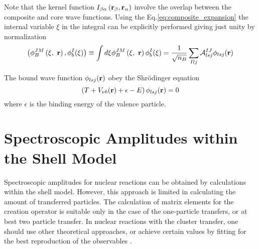 \documentclass[
12pt, %
oneside, %
english, %
onehalfspacing, %
onehalfspacing, %
headsepline, %
]{MastersDoctoralThesis} %
\begin{document}
Note that the kernel function $I_{\beta \alpha}   \left( {\bf r}_\beta ,  {\bf r}_\alpha \right)  $ involve the overlap between the composite and core wave functions. 
Using the Eq.\ref{eq:composite_expansion} the internal variable $\xi$ in the integral can be explicitly performed giving just unity by normalization
\begin{equation}
\left( \phi^{JM}_B \left( \xi,~{\bf r} \right), \phi_b^I ( \xi ) \right)
\equiv 
\int d \xi \phi^{JM}_B \left( \xi,~{\bf r} \right)  \phi_b^I ( \xi ) = 
\frac{1}{\sqrt{n_B}}
 \sum_{Ilj} \mathcal{A}_{lsj}^{IJ}  \phi_{lsj} ({\bf r})
\end{equation}
 
 The bound wave function $ \phi_{lsj} ({\bf r})$ obey the Shr\"{o}dinger equation 
 \begin{equation}
 \left( T + V_{\nu b} ({\bf r}) + \epsilon - E \right) \phi_{lsj} ({\bf r}) = 0
 \end{equation}
 where $\epsilon$ is the binding energy of the valence particle.
 
 
 
\section{Spectroscopic Amplitudes within the Shell Model}
Spectroscopic amplitudes for nuclear reactions can be obtained by calculations within the shell model. However, this approach is limited in calculating the amount of transferred particles. The calculation of matrix elements for the creation operator is suitable only in the case of the one-particle transfers, or at best two particle transfer. In nuclear reactions with the cluster transfer, one should use other theoretical approaches, or achieve certain values by fitting for the best reproduction of the observables \cite{brown2017}.
\end{document}
